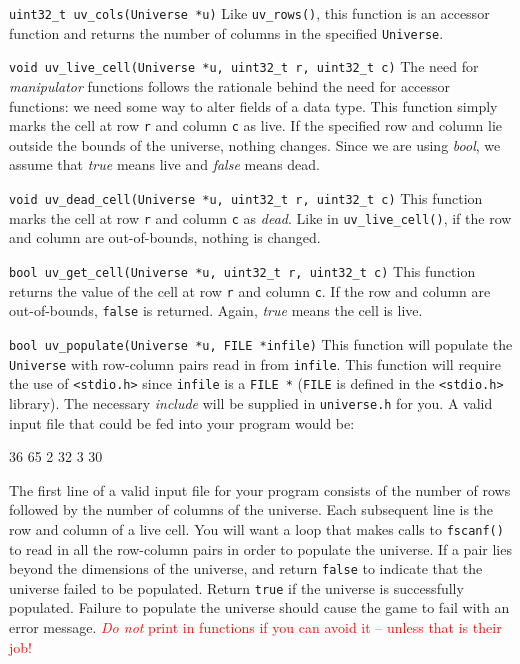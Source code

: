 \begin{funcdoc}{\texttt{uint32\_t uv\_cols(Universe *u)}}
  Like \texttt{uv\_rows()}, this function is an accessor function and returns
  the number of columns in the specified \texttt{Universe}.
\end{funcdoc}

\begin{funcdoc}{\texttt{void uv\_live\_cell(Universe *u, uint32\_t r, uint32\_t c)}}
  The need for \emph{manipulator} functions follows the rationale behind the need
  for accessor functions: we need some way to alter fields of a data type. This
  function simply marks the cell at row \texttt{r} and column \texttt{c} as live.
  If the specified row and column lie outside the bounds of the universe, nothing
  changes. Since we are using \emph{bool}, we assume that \emph{true} means live
  and \emph{false} means dead.
\end{funcdoc}

\begin{funcdoc}{\texttt{void uv\_dead\_cell(Universe *u, uint32\_t r, uint32\_t c)}}
  This function marks the cell at row \texttt{r} and column \texttt{c} as
  \emph{dead}. Like in \texttt{uv\_live\_cell()}, if the row and column are
  out-of-bounds, nothing is changed.
\end{funcdoc}

\begin{funcdoc}{\texttt{bool uv\_get\_cell(Universe *u, uint32\_t r, uint32\_t c)}}
  This function returns the value of the cell at row \texttt{r} and column
  \texttt{c}. If the row and column are out-of-bounds, \texttt{false} is
  returned. Again, \emph{true} means the cell is live.
\end{funcdoc}

\begin{funcdoc}{\texttt{bool uv\_populate(Universe *u, FILE *infile)}}
  This function will populate the \texttt{Universe} with row-column pairs read in
  from \texttt{infile}. This function will require the use of \texttt{<stdio.h>}
  since \texttt{infile} is a \texttt{FILE *} (\texttt{FILE} is defined in the
  \texttt{<stdio.h>} library). The necessary \emph{include} will be supplied in
  \texttt{universe.h} for you. A valid input file that could be fed into your
  program would be:

\begin{clisting}{}
36 65
2 32
3 30
\end{clisting}

  The first line of a valid input file for your program consists of the number
  of rows followed by the number of columns of the universe. Each subsequent
  line is the row and column of a live cell. You will want a loop that makes
  calls to \texttt{fscanf()} to read in all the row-column pairs in order to
  populate the universe. If a pair lies beyond the dimensions of the universe,
  and return \texttt{false} to indicate that the universe failed to be
  populated. Return \texttt{true} if the universe is successfully populated.
  Failure to populate the universe should cause the game to fail with an error
  message. \textcolor{red}{\emph{Do not} print in functions if you can avoid it
  -- unless that is their job!}
\end{funcdoc}

